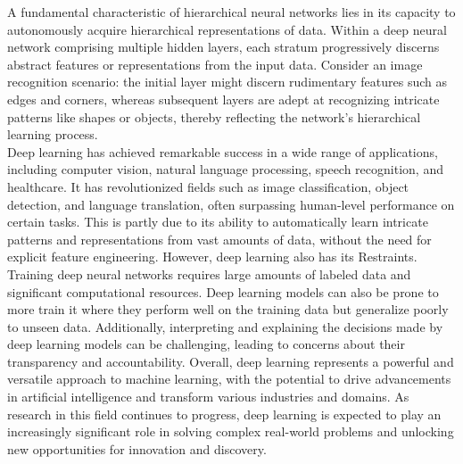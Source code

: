 A fundamental characteristic of hierarchical neural networks lies in its capacity to autonomously acquire hierarchical representations of data. Within a deep neural network comprising multiple hidden layers, each stratum progressively discerns abstract features or representations from the input data. Consider an image recognition scenario: the initial layer might discern rudimentary features such as edges and corners, whereas subsequent layers are adept at recognizing intricate patterns like shapes or objects, thereby reflecting the network's hierarchical learning process.
\\
Deep learning has achieved remarkable success in a wide range of applications, including computer vision, natural language processing, speech recognition, and healthcare. It has revolutionized fields such as image classification, object detection, and language translation, often surpassing human-level performance on certain tasks. This is partly due to its ability to automatically learn intricate patterns and representations from vast amounts of data, without the need for explicit feature engineering.
However, deep learning also has its Restraints. Training deep neural networks requires large amounts of labeled data and significant computational resources. Deep learning models can also be prone to more train it where they perform well on the training data but generalize poorly to unseen data. Additionally, interpreting and explaining the decisions made by deep learning models can be challenging, leading to concerns about their transparency and accountability.
Overall, deep learning represents a powerful and versatile approach to machine learning, with the potential to drive advancements in artificial intelligence and transform various industries and domains. As research in this field continues to progress, deep learning is expected to play an increasingly significant role in solving complex real-world problems and unlocking new opportunities for innovation and discovery.
